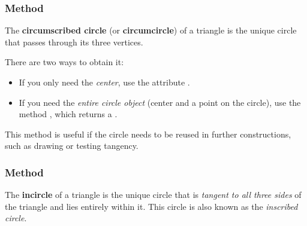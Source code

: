 \subsubsection{Method } %
\label{ssub:method_triangle_circum_circle}

The \textbf{circumscribed circle} (or \textbf{circumcircle}) of a triangle is the unique circle that passes through its three vertices.

\medskip

There are two ways to obtain it:
\begin{itemize}
  \item If you only need the \emph{center}, use the attribute .
  \item If you need the \emph{entire circle object} (center and a point on the circle), use the method , which returns a .
\end{itemize}


This method is useful if the circle needs to be reused in further constructions, such as drawing or testing tangency.

\vspace{1em}

\begin{tkzexample}[latex=.5\textwidth]
\begin{center}
\end{center}
\end{tkzexample}

\subsubsection{Method } %
\label{ssub:method_triangle_in_circle}

The \textbf{incircle} of a triangle is the unique circle that is \emph{tangent to all three sides} of the triangle and lies entirely within it. This circle is also known as the \emph{inscribed circle}.

\medskip

